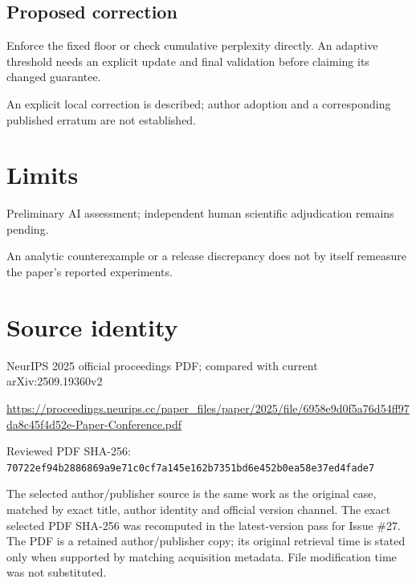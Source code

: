 \documentclass[11pt]{article}
\begin{document}
\subsection*{Proposed correction}

Enforce the fixed floor or check cumulative perplexity directly. An adaptive threshold needs an explicit update and final validation before claiming its changed guarantee.

An explicit local correction is described; author adoption and a corresponding published erratum are not established.

\section*{Limits}

Preliminary AI assessment; independent human scientific adjudication remains pending.\par

An analytic counterexample or a release discrepancy does not by itself remeasure the paper’s reported experiments.\par

\section*{Source identity}

NeurIPS 2025 official proceedings PDF; compared with current arXiv:2509.19360v2

\url{https://proceedings.neurips.cc/paper_files/paper/2025/file/6958e9d0f5a76d54ff97da8c45f4d52e-Paper-Conference.pdf}

Reviewed PDF SHA-256: \nolinkurl{70722ef94b2886869a9e71c0cf7a145e162b7351bd6e452b0ea58e37ed4fade7}

The selected author/publisher source is the same work as the original case, matched by exact title, author identity and official version channel. The exact selected PDF SHA-256 was recomputed in the latest-version pass for Issue \#27. The PDF is a retained author/publisher copy; its original retrieval time is stated only when supported by matching acquisition metadata. File modification time was not substituted.
\end{document}
